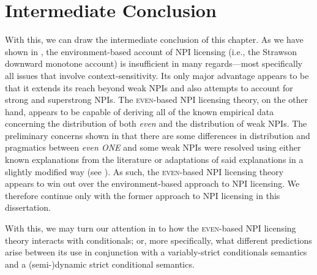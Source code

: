 \section{Intermediate Conclusion}
With this, we can draw the intermediate conclusion of this chapter. As we have shown in , the environment-based account of NPI licensing (i.e., the Strawson downward monotone account) is insufficient in many regards---most specifically all issues that involve context-sensitivity. Its only major advantage appears to be that it extends its reach beyond weak NPIs and also attempts to account for strong and superstrong NPIs. The {\scshape even}-based NPI licensing theory, on the other hand, appears to be capable of deriving all of the known empirical data concerning the distribution of both \textit{even} and the distribution of weak NPIs. The preliminary concerns shown in  that there are some differences in distribution and pragmatics between \textit{even \MakeUppercase{one}} and some weak NPIs were resolved using either known explanations from the literature \parencite{Crnic2011,Crnic2014-dogma,Crnic2014-nm,Jeong2021,Jeong2022} or adaptations of said explanations in a slightly modified way (see ). As such, the {\scshape even}-based NPI licensing theory appears to win out over the environment-based approach to NPI licensing. We therefore continue only with the former approach to NPI licensing in this dissertation.

With this, we may turn our attention in  to how the {\scshape even}-based NPI licensing theory interacts with conditionals; or, more specifically, what different predictions arise between its use in conjunction with a variably-strict conditionals semantics and a (semi-)dynamic strict conditional semantics.
